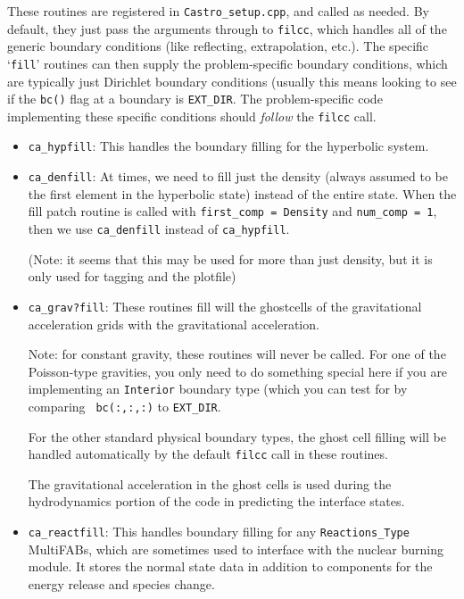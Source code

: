 \begin{itemize}
  These routines are registered in {\tt Castro\_setup.cpp}, and
  called as needed.  By default, they just
  pass the arguments through to {\tt filcc}, which handles all of
  the generic boundary conditions (like reflecting, extrapolation,
  etc.).  The specific `{\tt fill}' routines can then supply the
  problem-specific boundary conditions, which are typically just
  Dirichlet boundary conditions (usually this means looking to see
  if the {\tt bc()} flag at a boundary is {\tt EXT\_DIR}.  The
  problem-specific code implementing these specific conditions
  should {\em follow} the {\tt filcc} call.

  \begin{itemize}
  \item {\tt ca\_hypfill}:
    This handles the boundary filling for the hyperbolic system.

  \item {\tt ca\_denfill}: At times, we need to fill just the density
    (always assumed to be the first element in the hyperbolic state)
    instead of the entire state.  When the fill patch routine is called
    with {\tt first\_comp = Density} and {\tt num\_comp = 1}, then we
    use {\tt ca\_denfill} instead of {\tt ca\_hypfill}.

    (Note: it seems that this may be used for more than just
    density, but it is only used for tagging and the plotfile)

  \item {\tt ca\_grav?fill}: These routines fill will the ghostcells
    of the gravitational acceleration grids with the gravitational
    acceleration.

    Note: for constant gravity, these routines will never be called.
    For one of the Poisson-type gravities, you only need to do
    something special here if you are implementing an {\tt Interior}
    boundary type (which you can test for by comparing {\tt
    bc(:,:,:)} to {\tt EXT\_DIR}.

    For the other standard physical boundary types, the ghost cell
    filling will be handled automatically by the default {\tt filcc}
    call in these routines.

    The gravitational acceleration in the ghost cells is used during
    the hydrodynamics portion of the code in predicting the
    interface states.

  \item {\tt ca\_reactfill}: This handles boundary filling for
    any {\tt Reactions\_Type} MultiFABs, which are sometimes used to interface
    with the nuclear burning module. It stores the normal state data
    in addition to components for the energy release and species change.


\end{itemize}
\end{itemize}
